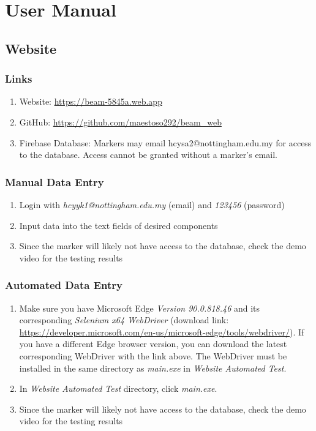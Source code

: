 \documentclass[../report.tex]{subfiles}
\begin{document}
\section{User Manual}
\subsection{Website}
\subsubsection{Links}
\begin{enumerate}
\item Website: \url{https://beam-5845a.web.app}
\item GitHub: \url{https://github.com/maestoso292/beam_web}
\item Firebase Database: Markers may email hcysa2@nottingham.edu.my for access to the database. Access cannot be granted without a marker's email.
\end{enumerate}

\subsubsection{Manual Data Entry}
\begin{enumerate}
\item Login with \textit{hcyyk1@nottingham.edu.my} (email) and \textit{123456} (password)
\item Input data into the text fields of desired components
\item Since the marker will likely not have access to the database, check the demo video for the testing results
\end{enumerate}

\subsubsection{Automated Data Entry}
\begin{enumerate}
\item Make sure you have Microsoft Edge \textit{Version 90.0.818.46} and its corresponding \textit{Selenium x64 WebDriver} (download link: \url{https://developer.microsoft.com/en-us/microsoft-edge/tools/webdriver/}). If you have a different Edge browser version, you can download the latest corresponding WebDriver with the link above. The WebDriver must be installed in the same directory as \textit{main.exe} in \textit{Website Automated Test}.
\item In \textit{Website Automated Test} directory, click \textit{main.exe}.
\item Since the marker will likely not have access to the database, check the demo video for the testing results
\end{enumerate}
\end{document}
